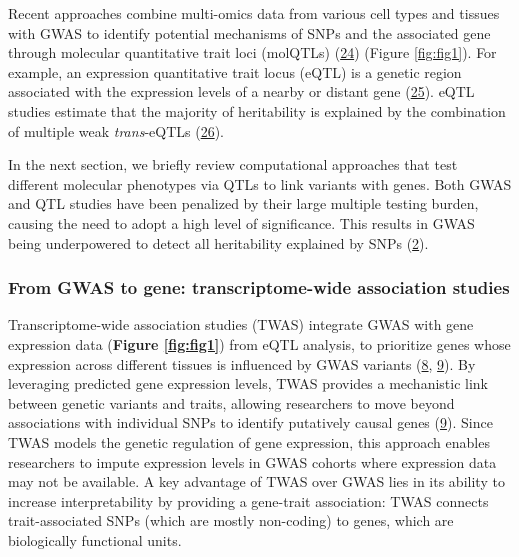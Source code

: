 Recent approaches combine multi-omics data from various cell types and tissues with GWAS to identify potential mechanisms of SNPs and the associated gene through molecular quantitative trait loci (molQTLs) (\protect\hyperlink{ref-QIEm5ZWK}{24}) (Figure \ref{fig:fig1}).
For example, an expression quantitative trait locus (eQTL) is a genetic region associated with the expression levels of a nearby or distant gene (\protect\hyperlink{ref-1FHKg3JK5}{25}).
eQTL studies estimate that the majority of heritability is explained by the combination of multiple weak \emph{trans}-eQTLs (\protect\hyperlink{ref-sGgkLsyy}{26}).

In the next section, we briefly review computational approaches that test different molecular phenotypes via QTLs to link variants with genes.
Both GWAS and QTL studies have been penalized by their large multiple testing burden, causing the need to adopt a high level of significance.
This results in GWAS being underpowered to detect all heritability explained by SNPs (\protect\hyperlink{ref-17B4AigZT}{2}).

\hypertarget{from-gwas-to-gene-transcriptome-wide-association-studies}{%
\subsubsection{From GWAS to gene: transcriptome-wide association studies}\label{from-gwas-to-gene-transcriptome-wide-association-studies}}

Transcriptome-wide association studies (TWAS) integrate GWAS with gene expression data (\textbf{Figure \ref{fig:fig1}}) from eQTL analysis, to prioritize genes whose expression across different tissues is influenced by GWAS variants (\protect\hyperlink{ref-ReOPt75u}{8}, \protect\hyperlink{ref-l6ogswV3}{9}).
By leveraging predicted gene expression levels, TWAS provides a mechanistic link between genetic variants and traits, allowing researchers to move beyond associations with individual SNPs to identify putatively causal genes (\protect\hyperlink{ref-l6ogswV3}{9}).
Since TWAS models the genetic regulation of gene expression, this approach enables researchers to impute expression levels in GWAS cohorts where expression data may not be available.
A key advantage of TWAS over GWAS lies in its ability to increase interpretability by providing a gene-trait association: TWAS connects trait-associated SNPs (which are mostly non-coding) to genes, which are biologically functional units.

